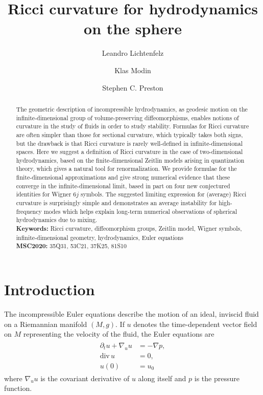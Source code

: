 \documentclass[11pt]{amsart}
\title{Ricci curvature for hydrodynamics on the sphere}
\author{Leandro Lichtenfelz}
\author{Klas Modin}
\author{Stephen C. Preston}
\numberwithin{equation}{section}
\theoremstyle{definition}
\begin{document}
  



\begin{abstract}
    The geometric description of incompressible hydrodynamics, as geodesic motion on the infinite-dimensional group of volume-preserving diffeomorphisms, enables notions of curvature in the study of fluids in order to study stability.
    Formulas for Ricci curvature are often simpler than those for sectional curvature, which typically takes both signs, but the drawback is that Ricci curvature is rarely well-defined in infinite-dimensional spaces.
    Here we suggest a definition of Ricci curvature in the case of two-dimensional hydrodynamics,  
    based on the finite-dimensional Zeitlin models arising in quantization theory, which gives a natural tool for renormalization.
    We provide formulae for the finite-dimensional approximations and give strong numerical evidence that these converge in the infinite-dimensional limit, based in part on four new conjectured identities for Wigner $6j$ symbols.
    The suggested limiting expression for (average) Ricci curvature is surprisingly simple and demonstrates an average instability for high-frequency modes which helps explain long-term numerical observations of spherical hydrodynamics due to mixing.
    \\[2ex]
    \textbf{Keywords:} Ricci curvature, diffeomorphism groups, Zeitlin model, Wigner symbols, infinite-dimensional geometry, hydrodynamics, Euler equations
    \\[2ex]
    \textbf{MSC2020:} 35Q31, 53C21, 37K25, 81S10
\end{abstract}

\maketitle 

\tableofcontents

\section{Introduction}

The incompressible Euler equations describe the motion of an ideal, inviscid fluid on a Riemannian manifold $(M, g)$. 
If $u$ denotes the time-dependent vector field on $M$ representing the velocity of the fluid, the Euler equations are
\begin{gather}\label{eq_euler}
\begin{split}
\partial_tu + \nabla_uu &= -\nabla p, \\
\mathrm{div}\, u &= 0, \\
u(0) &= u_0
\end{split}
\end{gather}
where $\nabla_uu$ is the covariant derivative of $u$ along itself and $p$ is the pressure function. 
\end{document}
